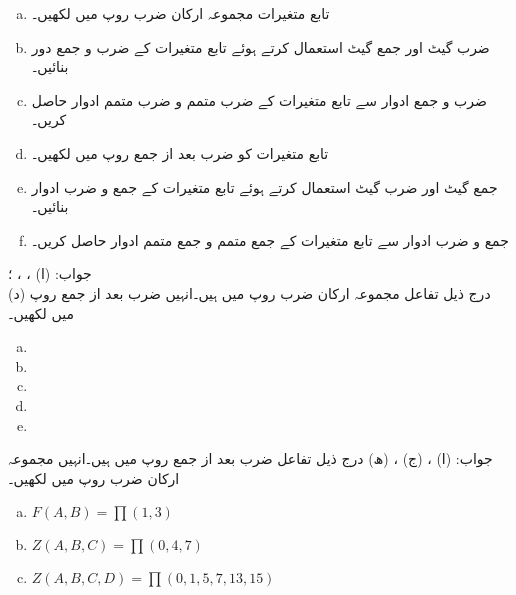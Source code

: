 \begin{enumerate}[a.]

\item
تابع متغیرات     مجموعہ ارکان ضرب   روپ میں لکھیں۔

\item
 ضرب گیٹ اور  جمع گیٹ استعمال کرتے ہوئے تابع متغیرات کے ضرب و جمع دور بنائیں۔

\item
ضرب و جمع ادوار سے تابع متغیرات کے ضرب متمم و  ضرب متمم ادوار حاصل کریں۔

\item
 تابع متغیرات  کو ضرب بعد از جمع  روپ میں لکھیں۔

\item
 جمع گیٹ اور ضرب گیٹ استعمال کرتے ہوئے تابع متغیرات کے جمع و ضرب  ادوار بنائیں۔

\item
جمع و ضرب ادوار سے تابع متغیرات کے جمع متمم و جمع متمم ادوار حاصل کریں۔
\end{enumerate}

جواب: (ا) ، ، ؛  \\
(د) 
درج ذیل تفاعل مجموعہ ارکان ضرب  روپ میں ہیں۔انہیں  ضرب بعد از جمع روپ میں لکھیں۔
\begin{multicols}{2}
\begin{enumerate}[a.]
\item
\item
\item
\item
\item
\end{enumerate}
\end{multicols}

جواب:  (ا) ، (ج) ،  (ھ) 
درج ذیل تفاعل  ضرب بعد از جمع  روپ میں ہیں۔انہیں مجموعہ ارکان ضرب روپ میں لکھیں۔
\begin{multicols}{2}
\begin{enumerate}[a.]
\item
\( F(A,B)=\prod (1,3)\)
\item
\( Z(A,B,C)=\prod (0,4,7) \)
\item
\( Z(A,B,C,D)=\prod (0,1,5,7,13,15) \)
\end{enumerate}
\end{multicols}

